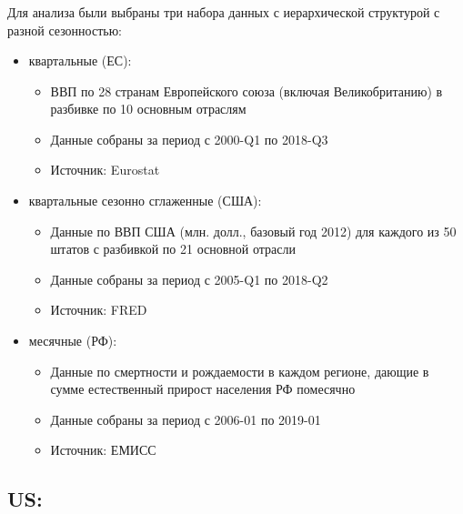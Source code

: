 \documentclass[c, dvipsnames]{beamer}  %
\begin{document}
\begin{frame}[shrink=5]
\frametitle{\insertsection} 
\framesubtitle{\insertsubsection}


Для анализа были выбраны три набора данных с иерархической структурой с разной сезонностью: 

\begin{itemize}
	\item квартальные (ЕС):
	
	\begin{itemize}
		\item ВВП по 28 странам Европейского союза (включая Великобританию) в разбивке по 10 основным отраслям
		\item Данные собраны за период с 2000-Q1 по 2018-Q3
		\item Источник: Eurostat
	\end{itemize}
	

	\item квартальные сезонно сглаженные (США):
	
	\begin{itemize}
		\item Данные по ВВП США (млн. долл., базовый год 2012) для каждого из 50 штатов с разбивкой по 21 основной отрасли
		\item Данные собраны за период с 2005-Q1 по 2018-Q2
		\item Источник: FRED
	\end{itemize}
		
	\item месячные (РФ):
	
	\begin{itemize}
		\item Данные по смертности и рождаемости в каждом регионе, дающие в сумме естественный прирост населения РФ помесячно
		\item Данные собраны за период с 2006-01 по 2019-01 
		\item Источник: ЕМИСС
	\end{itemize}
		
		
\end{itemize}

\end{frame}



\subsection{US:} 


\end{document}
